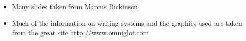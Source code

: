 \documentclass[a4paper,landscape,headrule,footrule,xetex]{foils}
\begin{document}

\begin{itemize}
\item Many slides taken from Marcus Dickinson
\item Much of the information on writing systems and the graphics used are taken from the great site \url{http://www.omniglot.com}
\end{itemize}




\end{document}
